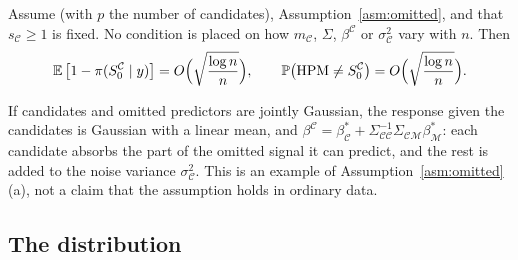 \begin{theorem}\label{thm:omitted}
Assume  (with $p$ the number of candidates), Assumption~\ref{asm:omitted}, and that $s_{\mathcal C}\ge1$ is fixed. No
condition is placed on how $m_{\mathcal C}$, $\Sigma$, $\beta^{\mathcal C}$ or $\sigma^2_{\mathcal C}$ vary with $n$. Then
\[
  \operatorname{\mathbb{E}}\big[1-\pi(S_0^{\mathcal C}\mid y)\big]=O\Big(\sqrt{\frac{\log n}{n}}\Big),\qquad
  \mathbb{P}\big(\mathrm{HPM}\neq S_0^{\mathcal C}\big)=O\Big(\sqrt{\frac{\log n}{n}}\Big).
\]
\end{theorem}


\begin{example}\label{ex:omitted}
If candidates and omitted predictors are jointly Gaussian, the response given the candidates is Gaussian with a linear
mean, and $\beta^{\mathcal C}=\beta^*_{\mathcal C}+\Sigma_{\mathcal C\mathcal C}^{-1}\Sigma_{\mathcal C\mathcal M}\beta^*_{\mathcal M}$:
each candidate absorbs the part of the omitted signal it can predict, and the rest is added to the noise variance
$\sigma^2_{\mathcal C}$. This is an example of Assumption~\ref{asm:omitted}(a), not a claim that the assumption holds in
ordinary data.
\end{example}

\subsection{The distribution}\label{sec:supp-dist}


